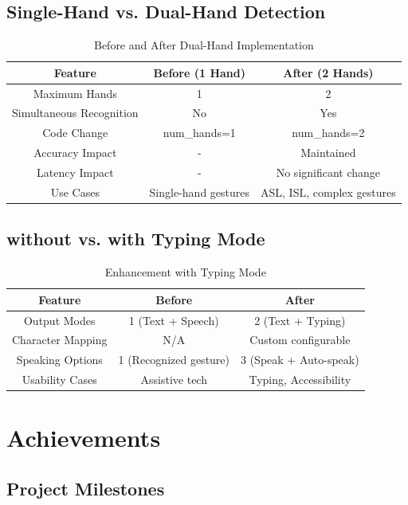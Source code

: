 \subsection{Single-Hand vs. Dual-Hand Detection}

\begin{table}[H]
\centering
\begin{tabular}{|c|c|c|}
\hline
\textbf{Feature} & \textbf{Before (1 Hand)} & \textbf{After (2 Hands)} \\
\hline
Maximum Hands & 1 & 2 \\
\hline
Simultaneous Recognition & No & Yes \\
\hline
Code Change & num\_hands=1 & num\_hands=2 \\
\hline
Accuracy Impact & - & Maintained \\
\hline
Latency Impact & - & No significant change \\
\hline
Use Cases & Single-hand gestures & ASL, ISL, complex gestures \\
\hline
\end{tabular}
\caption{Before and After Dual-Hand Implementation}
\end{table}

\subsection{without vs. with Typing Mode}

\begin{table}[H]
\centering
\begin{tabular}{|c|c|c|}
\hline
\textbf{Feature} & \textbf{Before} & \textbf{After} \\
\hline
Output Modes & 1 (Text + Speech) & 2 (Text + Typing) \\
\hline
Character Mapping & N/A & Custom configurable \\
\hline
Speaking Options & 1 (Recognized gesture) & 3 (Speak + Auto-speak) \\
\hline
Usability Cases & Assistive tech & Typing, Accessibility \\
\hline
\end{tabular}
\caption{Enhancement with Typing Mode}
\end{table}

\section{Achievements}

\subsection{Project Milestones}


